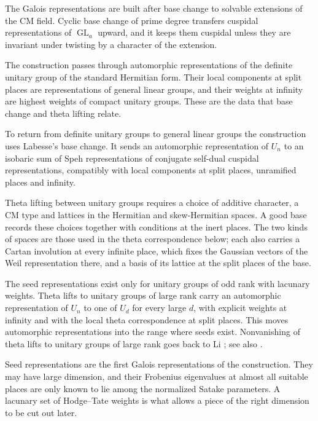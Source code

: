 The Galois representations are built after base change to solvable extensions of the CM field. Cyclic
base change of prime degree transfers cuspidal representations of $\operatorname{GL}_a$ upward, and
it keeps them cuspidal unless they are invariant under twisting by a character of the extension.

The construction passes through automorphic representations of the definite unitary group of the
standard Hermitian form. Their local components at split places are representations of general
linear groups, and their weights at infinity are highest weights of compact unitary groups. These
are the data that base change and theta lifting relate.

To return from definite unitary groups to general linear groups the construction uses Labesse's
base change. It sends an automorphic representation of $U_n$ to an isobaric sum of Speh
representations of conjugate self-dual cuspidal representations, compatibly with local components at
split places, unramified places and infinity.

Theta lifting between unitary groups requires a choice of additive character, a CM type and lattices
in the Hermitian and skew-Hermitian spaces. A good base records these choices together with
conditions at the inert places. The two kinds of spaces are those used in the theta correspondence
below; each also carries a Cartan involution at every infinite place, which fixes the Gaussian vectors
of the Weil representation there, and a basis of its lattice at the split places of the base.

The seed representations exist only for unitary groups of odd rank with lacunary weights. Theta lifts
to unitary groups of large rank carry an automorphic representation of $U_n$ to one of $U_d$ for
every large $d$, with explicit weights at infinity and with the local theta correspondence at split
places. This moves automorphic representations into the range where seeds exist. Nonvanishing of
theta lifts to unitary groups of large rank goes back to Li \cite{Li90}; see also \cite{HKS96}.

Seed representations are the first Galois representations of the construction. They may have large
dimension, and their Frobenius eigenvalues at almost all suitable places are only known to lie among
the normalized Satake parameters. A lacunary set of Hodge--Tate weights is what allows a piece of the
right dimension to be cut out later.

